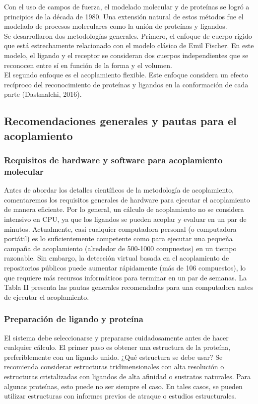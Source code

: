 {{\noindent Con el uso de campos de fuerza, el modelado molecular y de proteínas se logró a principios de la década de 1980. Una extensión natural de estos métodos fue el modelado de procesos moleculares como la unión de proteínas y ligandos.\\
\noindent Se desarrollaron dos metodologías generales. Primero, el enfoque de cuerpo rígido que está estrechamente relacionado con el modelo clásico de Emil Fischer. En este modelo, el ligando y el receptor se consideran dos cuerpos independientes que se reconocen entre sí en función de la forma y el volumen.\\
\noindent El segundo enfoque es el acoplamiento flexible. Este enfoque considera un efecto recíproco del reconocimiento de proteínas y ligandos en la conformación de cada parte (Dastmalchi, 2016).

\subsection{Recomendaciones generales y pautas para el acoplamiento}

\subsubsection{Requisitos de hardware y software para acoplamiento molecular}

\noindent Antes de abordar los detalles científicos de la metodología de acoplamiento, comentaremos los requisitos generales de hardware para ejecutar el acoplamiento de manera eficiente. Por lo general, un cálculo de acoplamiento no se considera intensivo en CPU, ya que los ligandos se pueden acoplar y evaluar en un par de minutos. Actualmente, casi cualquier computadora personal (o computadora portátil) es lo suficientemente competente como para ejecutar una pequeña campaña de acoplamiento (alrededor de 500-1000 compuestos) en un tiempo razonable. Sin embargo, la detección virtual basada en el acoplamiento de repositorios públicos puede aumentar rápidamente (más de 106 compuestos), lo que requiere más recursos informáticos para terminar en un par de semanas. La Tabla II presenta las pautas generales recomendadas para una computadora antes de ejecutar el acoplamiento.\\


\subsubsection{Preparación de ligando y proteína}
\noindent El sistema debe seleccionarse y prepararse cuidadosamente antes de hacer cualquier cálculo. El primer paso es obtener una estructura de la proteína, preferiblemente con un ligando unido. ¿Qué estructura se debe usar? Se recomienda considerar estructuras tridimensionales con alta resolución o estructuras cristalizadas con ligandos de alta afinidad o sustratos naturales. Para algunas proteínas, esto puede no ser siempre el caso. En tales casos, se pueden utilizar estructuras con informes previos de atraque o estudios estructurales.\\

}}
